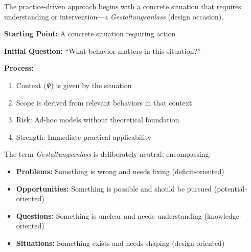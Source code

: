 The practice-driven approach begins with a concrete situation that requires
understanding or intervention---a \textit{Gestaltungsanlass} (design occasion).

\begin{tcolorbox}[colback=gray!5!white, colframe=gray!75!black,
    title=Practice-Driven Entry: Gestaltungsanlass]
\textbf{Starting Point:} A concrete situation requiring action

\textbf{Initial Question:} ``What behavior matters in this situation?''

\textbf{Process:}
\begin{enumerate}[nosep]
\item Context ($\Psi$) is given by the situation
\item Scope is derived from relevant behaviors in that context
\item Risk: Ad-hoc models without theoretical foundation
\item Strength: Immediate practical applicability
\end{enumerate}
\end{tcolorbox}

The term \textit{Gestaltungsanlass} is deliberately neutral, encompassing:
\begin{itemize}
\item \textbf{Problems:} Something is wrong and needs fixing (deficit-oriented)
\item \textbf{Opportunities:} Something is possible and should be pursued (potential-oriented)
\item \textbf{Questions:} Something is unclear and needs understanding (knowledge-oriented)
\item \textbf{Situations:} Something exists and needs shaping (design-oriented)
\end{itemize}

